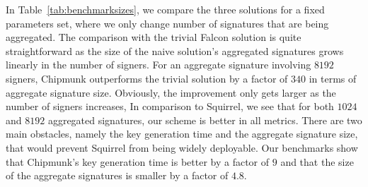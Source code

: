 In Table~\ref{tab:benchmarksizes}, we compare the three solutions for a fixed parameters set, where we only change number of signatures that are being aggregated.
The comparison with the trivial Falcon solution is quite straightforward as the size of the naive solution's aggregated signatures grows linearly in the number of signers.
For an aggregate signature involving $8192$ signers, Chipmunk outperforms the trivial solution by a factor of $340$ in terms of aggregate signature size.
Obviously, the improvement only gets larger as the number of signers increases,
In comparison to Squirrel, we see that for both $1024$ and $8192$ aggregated signatures, our scheme is better in all metrics.
There are two main obstacles, namely the key generation time and the aggregate signature size, that would prevent Squirrel from being widely deployable.
Our benchmarks show that Chipmunk's key generation time is better by a factor of $9$ and that the size of the aggregate signatures is smaller by a factor of $4.8$.
\bgroup
\setlength{\tabcolsep}{0.5em}
\renewcommand{\arraystretch}{1.1}
